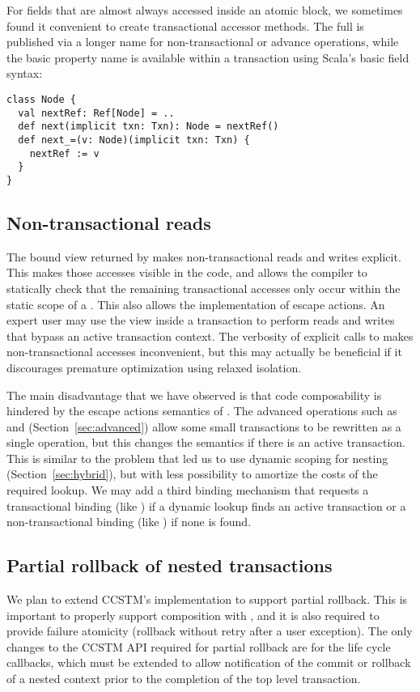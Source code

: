 For fields that are almost always accessed inside an atomic block, we
sometimes found it convenient to create transactional accessor methods.
The full  is published via a longer name for non-transactional
or advance operations, while the basic property name is available within
a transaction using Scala's basic field syntax:
\lstset{numbers=none}
\lstset{xleftmargin=0.125in}
\begin{lstlisting}
class Node {
  val nextRef: Ref[Node] = ..
  def next(implicit txn: Txn): Node = nextRef()
  def next_=(v: Node)(implicit txn: Txn) {
    nextRef := v 
  }
}
\end{lstlisting}
\lstset{xleftmargin=0.25in}
\lstset{numbers=left}

\subsection{Non-transactional reads}

The bound view returned by  makes
non-transactional reads and writes explicit.  This makes those accesses
visible in the code, and allows the compiler to statically check that
the remaining transactional accesses only occur within the static scope
of a .  This also allows the implementation of escape actions.
An expert user may use the  view inside a transaction to
perform reads and writes that bypass an active transaction context.
The verbosity of explicit calls to  makes non-transactional
accesses inconvenient, but this may actually be beneficial if it discourages
premature optimization using relaxed isolation.

The main disadvantage that we have observed is that code composability is
hindered by the escape actions semantics of .  The advanced
 operations such as  and 
(Section~\ref{sec:advanced}) allow some small transactions to be
rewritten as a single operation, but this changes the semantics if
there is an active transaction.  This is similar to the problem that
led us to use dynamic scoping for nesting (Section~\ref{sec:hybrid}),
but with less possibility to amortize the costs of the required
 lookup.  We may add a third binding mechanism that
requests a transactional binding (like ) if a
dynamic lookup finds an active transaction or a non-transactional binding
(like ) if none is found.

\subsection{Partial rollback of nested transactions}

We plan to extend CCSTM's implementation to support partial rollback.
This is important to properly support composition with , and
it is also required to provide failure atomicity (rollback without retry
after a user exception).  The only changes to the CCSTM API required
for partial rollback are for the life cycle callbacks, which must be
extended to allow notification of the commit or rollback of a nested
context prior to the completion of the top level transaction.


